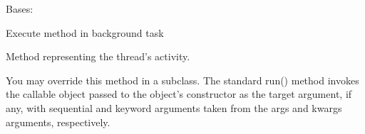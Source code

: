 \documentclass[letterpaper,10pt,english]{sphinxmanual}
\begin{document}
\begin{savenotes}\begin{fulllineitems}
\label{\detokenize{eezz:eezz.websocket.TAsyncHandler}}
\pysigstartsignatures
{}
\pysigstopsignatures
\sphinxAtStartPar
Bases: 

\sphinxAtStartPar
Execute method in background task

\begin{savenotes}\begin{fulllineitems}
\label{\detokenize{eezz:eezz.websocket.TAsyncHandler.run}}
\pysigstartsignatures
{}
\pysigstopsignatures
\sphinxAtStartPar
Method representing the thread’s activity.

\sphinxAtStartPar
You may override this method in a subclass. The standard run() method
invokes the callable object passed to the object’s constructor as the
target argument, if any, with sequential and keyword arguments taken
from the args and kwargs arguments, respectively.

\end{fulllineitems}\end{savenotes}


\end{fulllineitems}\end{savenotes}

\end{document}
